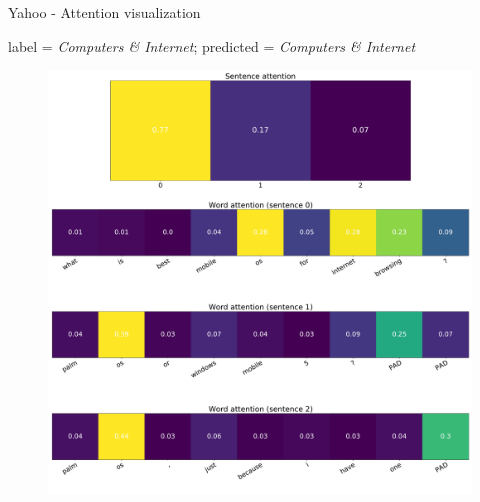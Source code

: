 \documentclass[10pt]{beamer}
\begin{document}
\begin{frame}{Yahoo - Attention visualization}

label = \textit{Computers \& Internet}; predicted = \textit{Computers \& Internet}

\begin{figure}
\centering
\includegraphics[scale=0.15]{img/yahoo-han-visual}
\end{figure}

\end{frame}
\end{document}
